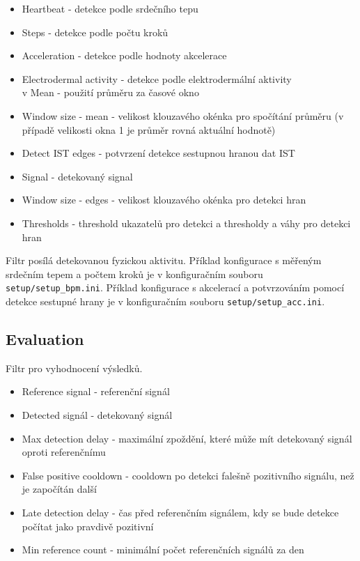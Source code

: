 \begin{itemize}
\setlength\itemsep{-1.5em}
\item Heartbeat - detekce podle srdečního tepu\\
\item Steps - detekce podle počtu kroků\\
\item Acceleration - detekce podle hodnoty akcelerace\\
\item Electrodermal activity - detekce podle elektrodermální aktivity\\
v Mean - použití průměru za časové okno\\
\item Window size - mean - velikost klouzavého okénka pro spočítání průměru (v případě velikosti okna 1 je průměr rovná aktuální hodnotě)\\
\item Detect IST edges - potvrzení detekce sestupnou hranou dat IST\\
\item Signal - detekovaný signal\\
\item Window size - edges - velikost klouzavého okénka pro detekci hran\\
\item Thresholds - threshold ukazatelů pro detekci a thresholdy a váhy pro detekci hran
\end{itemize}

\noindent Filtr posílá detekovanou fyzickou aktivitu.
Příklad konfigurace s měřeným srdečním tepem a počtem kroků je v konfiguračním souboru \texttt{setup/setup\_bpm.ini}. Příklad konfigurace s akcelerací a potvrzováním pomocí detekce sestupné hrany je v konfiguračním souboru \texttt{setup/setup\_acc.ini}.

\subsection*{Evaluation}

Filtr pro vyhodnocení výsledků.

\begin{itemize}
\setlength\itemsep{-1.5em}
\item Reference signal - referenční signál\\
\item Detected signál - detekovaný signál\\
\item Max detection delay - maximální zpoždění, které může mít detekovaný signál oproti referenčnímu\\
\item False positive cooldown - cooldown po detekci falešně pozitivního signálu, než je započítán další\\
\item Late detection delay - čas před referenčním signálem, kdy se bude detekce počítat jako pravdivě pozitivní\\
\item Min reference count - minimální počet referenčních signálů za den
\end{itemize}


